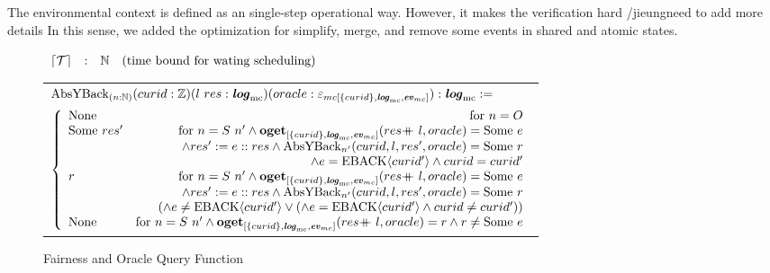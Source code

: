 The environmental context is defined as an single-step operational way. 
However, it makes the verification hard /jieung{need to add more details}
In this sense, we added the optimization for simplify, merge, and remove some events 
in shared and atomic states. 



\begin{figure}

$
\begin{array}{llll}
{\lceil{\mathcal{T}}\rceil} & : & {\mathbb{N}} &\mbox{(time bound for wating scheduling)} \\
\end{array}
$


\begin{tabular}{l}
$ \yieldbackfunckwd_{(n : \nattype)} (curid : \ztype) (l \ res : \mclog) (oracle : \mcoracle{\set{curid}}{\mclog}{\mcevent}) : \mclog := $\\
$ \left\{\begin{array}{lr}
       \optionnone & \text{for } n  = O \\
       
       \optionsome\ res' & \text{for } n = S\ n' \wedge \oget{\set{curid}}{\mclog}{\mcevent}{\listapp{res}{l}}{oracle}{e}\\ 
                  & \wedge res' := \listcons{e}{res} \wedge \yieldbackfunc{n'}{curid}{l}{res'}{oracle}{r} \\
                  & \wedge e = \yieldbackev{curid'} \wedge curid = curid' \\
        r & \text{for }n = S\ n' \wedge \oget{\set{curid}}{\mclog}{\mcevent}{\listapp{res}{l}}{oracle}{e}\\ 
                  & \wedge res' := \listcons{e}{res} \wedge \yieldbackfunc{n'}{curid}{l}{res'}{oracle}{r} \\
                  & (\wedge e \neq \yieldbackev{curid'} \vee (\wedge e = \yieldbackev{curid'} \wedge curid \neq curid')) \\
          \optionnone  & \text{for }n = S\ n' \wedge \ogetnoeq{\set{curid}}{\mclog}{\mcevent}{\listapp{res}{l}}{oracle} = r \wedge r \neq \optionsome \ e \\
        \end{array}\right .
$\\
\end{tabular}


\caption{Fairness and Oracle Query Function}
\label{fig:fairness-oracle-query}
\end{figure}


